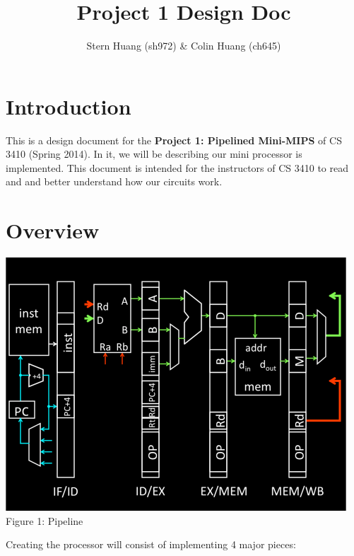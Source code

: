 \documentclass{article}
\begin{document}
\title{Project 1 Design Doc}
\author{Stern Huang (sh972) \& Colin Huang (ch645)}
\maketitle
\section{Introduction}
This is a design document for the \textbf{Project 1: Pipelined Mini-MIPS} of CS 3410 (Spring 2014). In it, we will be describing our mini processor is implemented. This document is intended for the instructors of CS 3410 to read and and better understand how our circuits work. \\

\section{Overview}
\begin{center}
\includegraphics[scale=1.3]{pipeline.png} \\
Figure 1: Pipeline
\end{center}
\newpage
Creating the processor will consist of implementing 4 major pieces: \\
\end{document}
